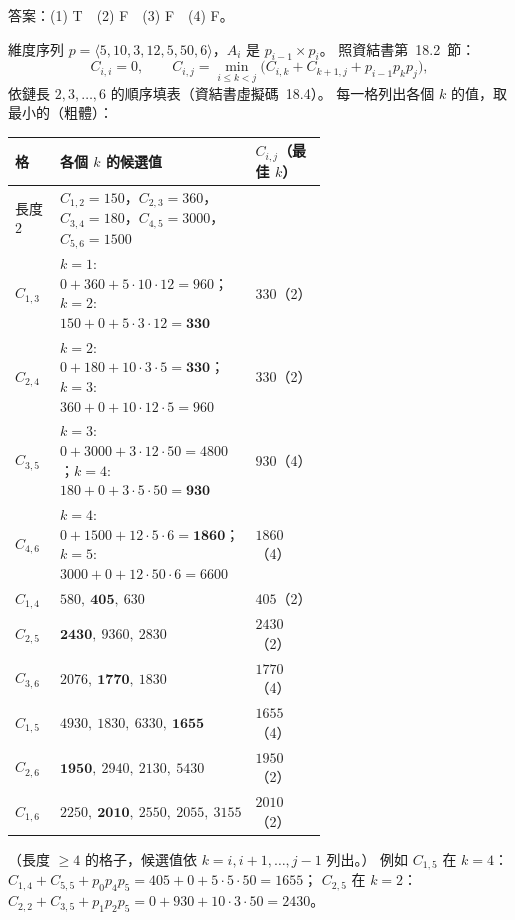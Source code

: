 \begin{pastsoln}
答案：(1) T　(2) F　(3) F　(4) F。

維度序列 $p = \langle 5, 10, 3, 12, 5, 50, 6\rangle$，$A_i$ 是 $p_{i-1} \times p_i$。 照資結書第~18.2~節：
\[
C_{i,i} = 0,\qquad C_{i,j} = \min_{i \le k < j}\bigl(C_{i,k} + C_{k+1,j} + p_{i-1}p_k p_j\bigr),
\]
依鏈長 $2, 3, \ldots, 6$ 的順序填表（資結書虛擬碼~18.4）。 每一格列出各個 $k$ 的值，取最小的（粗體）：
\begin{center}
\small
\begin{tabular}{lp{0.62\linewidth}l}
\toprule
格 & 各個 $k$ 的候選值 & $C_{i,j}$（最佳 $k$） \\
\midrule
長度 $2$ & $C_{1,2} = 150$，$C_{2,3} = 360$，$C_{3,4} = 180$，$C_{4,5} = 3000$，$C_{5,6} = 1500$ & \\
\midrule
$C_{1,3}$ & $k{=}1$: $0 + 360 + 5{\cdot}10{\cdot}12 = 960$；$k{=}2$: $150 + 0 + 5{\cdot}3{\cdot}12 = \mathbf{330}$ & $330$（2） \\
$C_{2,4}$ & $k{=}2$: $0 + 180 + 10{\cdot}3{\cdot}5 = \mathbf{330}$；$k{=}3$: $360 + 0 + 10{\cdot}12{\cdot}5 = 960$ & $330$（2） \\
$C_{3,5}$ & $k{=}3$: $0 + 3000 + 3{\cdot}12{\cdot}50 = 4800$；$k{=}4$: $180 + 0 + 3{\cdot}5{\cdot}50 = \mathbf{930}$ & $930$（4） \\
$C_{4,6}$ & $k{=}4$: $0 + 1500 + 12{\cdot}5{\cdot}6 = \mathbf{1860}$；$k{=}5$: $3000 + 0 + 12{\cdot}50{\cdot}6 = 6600$ & $1860$（4） \\
\midrule
$C_{1,4}$ & $580,\ \mathbf{405},\ 630$ & $405$（2） \\
$C_{2,5}$ & $\mathbf{2430},\ 9360,\ 2830$ & $2430$（2） \\
$C_{3,6}$ & $2076,\ \mathbf{1770},\ 1830$ & $1770$（4） \\
\midrule
$C_{1,5}$ & $4930,\ 1830,\ 6330,\ \mathbf{1655}$ & $1655$（4） \\
$C_{2,6}$ & $\mathbf{1950},\ 2940,\ 2130,\ 5430$ & $1950$（2） \\
\midrule
$C_{1,6}$ & $2250,\ \mathbf{2010},\ 2550,\ 2055,\ 3155$ & $2010$（2） \\
\bottomrule
\end{tabular}
\end{center}
（長度 $\ge 4$ 的格子，候選值依 $k = i, i+1, \ldots, j-1$ 列出。） 例如
$C_{1,5}$ 在 $k = 4$：$C_{1,4} + C_{5,5} + p_0 p_4 p_5 = 405 + 0 + 5 \cdot 5 \cdot 50 = 1655$；
$C_{2,5}$ 在 $k = 2$：$C_{2,2} + C_{3,5} + p_1 p_2 p_5 = 0 + 930 + 10 \cdot 3 \cdot 50 = 2430$。


\end{pastsoln}
